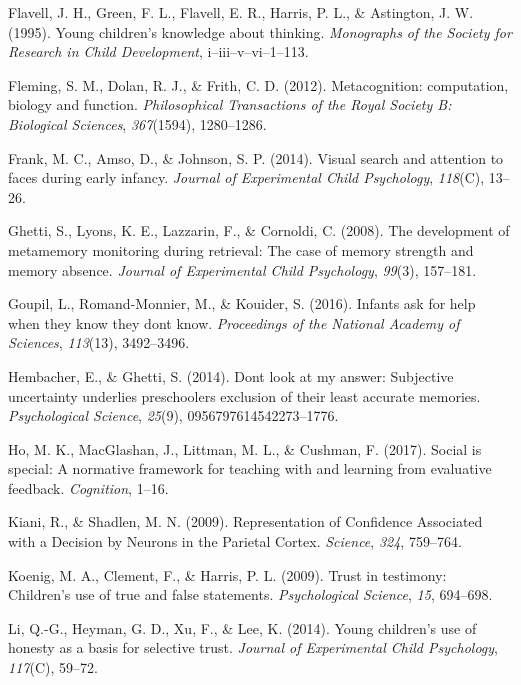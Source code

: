\documentclass[a4paper,man,apacite,floatsintext]{apa6}
\begin{document}
\hypertarget{ref-Flavell1995}{}
Flavell, J. H., Green, F. L., Flavell, E. R., Harris, P. L., \&
Astington, J. W. (1995). Young children's knowledge about thinking.
\emph{Monographs of the Society for Research in Child Development},
i--iii--v--vi--1--113.

\hypertarget{ref-Fleming2012}{}
Fleming, S. M., Dolan, R. J., \& Frith, C. D. (2012). Metacognition:
computation, biology and function. \emph{Philosophical Transactions of
the Royal Society B: Biological Sciences}, \emph{367}(1594), 1280--1286.

\hypertarget{ref-Frank2014}{}
Frank, M. C., Amso, D., \& Johnson, S. P. (2014). Visual search and
attention to faces during early infancy. \emph{Journal of Experimental
Child Psychology}, \emph{118}(C), 13--26.

\hypertarget{ref-Ghetti2008}{}
Ghetti, S., Lyons, K. E., Lazzarin, F., \& Cornoldi, C. (2008). The
development of metamemory monitoring during retrieval: The case of
memory strength and memory absence. \emph{Journal of Experimental Child
Psychology}, \emph{99}(3), 157--181.

\hypertarget{ref-Goupil2016}{}
Goupil, L., Romand-Monnier, M., \& Kouider, S. (2016). Infants ask for
help when they know they dont know. \emph{Proceedings of the National
Academy of Sciences}, \emph{113}(13), 3492--3496.

\hypertarget{ref-Hembacher2014}{}
Hembacher, E., \& Ghetti, S. (2014). Dont look at my answer: Subjective
uncertainty underlies preschoolers exclusion of their least accurate
memories. \emph{Psychological Science}, \emph{25}(9),
0956797614542273--1776.

\hypertarget{ref-Ho2017}{}
Ho, M. K., MacGlashan, J., Littman, M. L., \& Cushman, F. (2017). Social
is special: A normative framework for teaching with and learning from
evaluative feedback. \emph{Cognition}, 1--16.

\hypertarget{ref-Kiani2009}{}
Kiani, R., \& Shadlen, M. N. (2009). Representation of Confidence
Associated with a Decision by Neurons in the Parietal Cortex.
\emph{Science}, \emph{324}, 759--764.

\hypertarget{ref-Koenig2009}{}
Koenig, M. A., Clement, F., \& Harris, P. L. (2009). Trust in testimony:
Children's use of true and false statements. \emph{Psychological
Science}, \emph{15}, 694--698.

\hypertarget{ref-Li2014}{}
Li, Q.-G., Heyman, G. D., Xu, F., \& Lee, K. (2014). Young children's
use of honesty as a basis for selective trust. \emph{Journal of
Experimental Child Psychology}, \emph{117}(C), 59--72.
\end{document}
